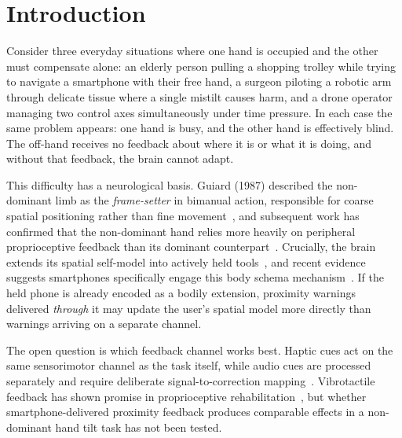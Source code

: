 \documentclass[sigconf]{acmart}
\begin{document}
\maketitle

\section{Introduction}

Consider three everyday situations where one hand is occupied and the other must compensate alone: an elderly person pulling a shopping trolley while trying to navigate a smartphone with their free hand, a surgeon piloting a robotic arm through delicate tissue where a single mistilt causes harm, and a drone operator managing two control axes simultaneously under time pressure.
In each case the same problem appears: one hand is busy, and the other hand is effectively blind.
The off-hand receives no feedback about where it is or what it is doing, and without that feedback, the brain cannot adapt.

This difficulty has a neurological basis.
Guiard (1987) described the non-dominant limb as the \emph{frame-setter} in bimanual action, responsible for coarse spatial positioning rather than fine movement~\cite{asymmetric_guiard_1987}, and subsequent work has confirmed that the non-dominant hand relies more heavily on peripheral proprioceptive feedback than its dominant counterpart~\cite{position_adamo_2009}.
Crucially, the brain extends its spatial self-model into actively held tools~\cite{tools_maravita_2004}, and recent evidence suggests smartphones specifically engage this body schema mechanism~\cite{smartphone_lin_2022}.
If the held phone is already encoded as a bodily extension, proximity warnings delivered \emph{through} it may update the user's spatial model more directly than warnings arriving on a separate channel.

The open question is which feedback channel works best.
Haptic cues act on the same sensorimotor channel as the task itself, while audio cues are processed separately and require deliberate signal-to-correction mapping~\cite{augmented_sigrist_2013}.
Vibrotactile feedback has shown promise in proprioceptive rehabilitation~\cite{robotassisted_cuppone_2016}, but whether smartphone-delivered proximity feedback produces comparable effects in a non-dominant hand tilt task has not been tested.
\end{document}
